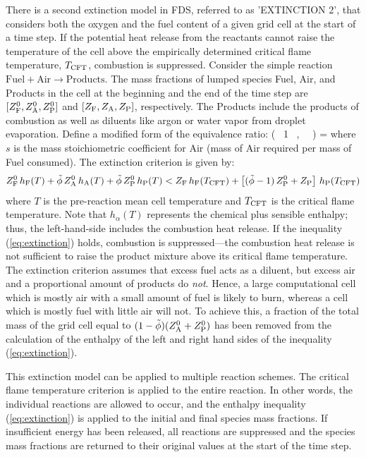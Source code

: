 There is a second extinction model in FDS, referred to as {\ct 'EXTINCTION 2'}, that considers both the oxygen and the fuel content of a given grid cell at the start of a time step. If the potential heat release from the reactants cannot raise the temperature of the cell above the empirically determined critical flame temperature, $T_{\rm CFT}$, combustion is suppressed.  Consider the simple reaction $\mbox{Fuel} + \mbox{Air} \rightarrow \mbox{Products}$. The mass fractions of lumped species Fuel, Air, and Products in the cell at the beginning and the end of the time step are $[Z_{\rm F}^0, Z_{\rm A}^0, Z_{\rm P}^0]$ and $[Z_{\rm F}, Z_{\rm A}, Z_{\rm P}]$, respectively. The Products include the products of combustion as well as diluents like argon or water vapor from droplet evaporation. Define a modified form of the equivalence ratio:
\be
   \label{eq:dza}
   \tilde{\phi} \equiv  \min \left( \, 1 \, , \,  \, \right) = 
\ee
where $s$ is the mass stoichiometric coefficient for Air (mass of Air required per mass of Fuel consumed). The extinction criterion is given by:
\begin{align}
\label{eq:extinction}
Z_{\rm F}^0 \, h_{\rm F}(T) + \tilde{\phi} \, Z_{\rm A}^0 \, h_{\rm A}(T) + \tilde{\phi} \, Z_{\rm P}^0 \, h_{\rm P}(T) <
Z_{\rm F} \, h_{\rm F}(T_{\rm CFT}) + \left[ (\tilde{\phi}-1) \, Z_{\rm P}^0 + Z_{\rm P} \right] \, h_{\rm P}(T_{\rm CFT})
\end{align}
where $T$ is the pre-reaction mean cell temperature and $T_{\rm CFT}$ is the critical flame temperature. Note that $h_\alpha(T)$ represents the chemical plus sensible enthalpy; thus, the left-hand-side includes the combustion heat release.  If the inequality (\ref{eq:extinction}) holds, combustion is suppressed---the combustion heat release is not sufficient to raise the product mixture above its critical flame temperature. The extinction criterion assumes that excess fuel acts as a diluent, but excess air and a proportional amount of products do \emph{not}. Hence, a large computational cell which is mostly air with a small amount of fuel is likely to burn, whereas a cell which is mostly fuel with little air will not. To achieve this, a fraction of the total mass of the grid cell equal to $(1-\tilde{\phi}) (Z_{\rm A}^0+Z_{\rm P}^0)$ has been removed from the calculation of the enthalpy of the left and right hand sides of the inequality (\ref{eq:extinction}).

This extinction model can be applied to multiple reaction schemes. The critical flame temperature criterion is applied to the entire reaction. In other words, the individual reactions are allowed to occur, and the enthalpy inequality (\ref{eq:extinction}) is applied to the initial and final species mass fractions. If insufficient energy has been released, all reactions are suppressed and the species mass fractions are returned to their original values at the start of the time step.


